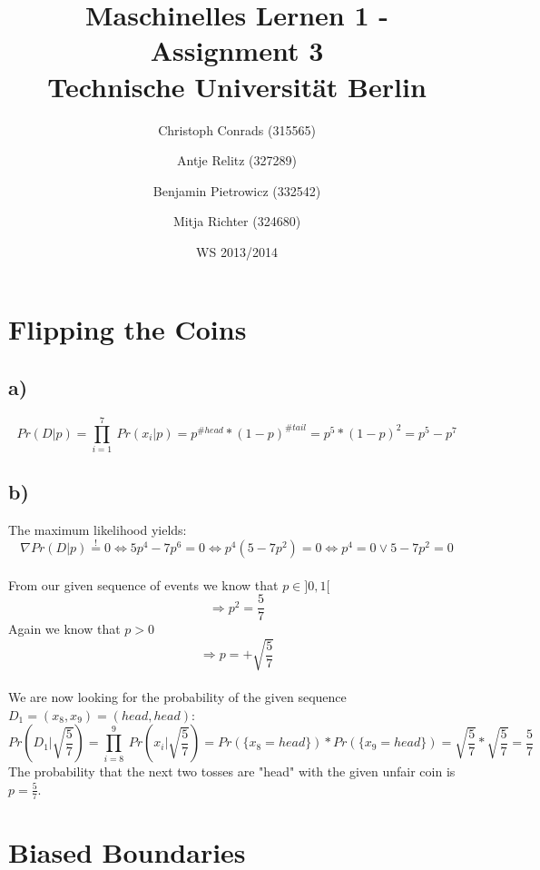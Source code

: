 \documentclass[paper=a4,fontsize=10pt,DIV11,BCOR10mm]{scrartcl}
\begin{document}
\title{Maschinelles Lernen 1 - Assignment 3\\
\small{Technische Universität Berlin}}


\author{\small{Christoph Conrads (315565)}\and \small{Antje Relitz (327289)}  \and \small{Benjamin Pietrowicz (332542)} \and \small{Mitja Richter (324680)} }

\date{WS 2013/2014}

\maketitle

\section{Flipping the Coins}

\subsection*{a)}

\[ Pr (D|p) = \prod_{i=1}^7\ Pr(x_i|p) = p^{\# head} * (1-p)^{\# tail} = p^5 * (1-p)^2 = p^5-p^7 \]



\subsection*{b)}
The maximum likelihood yields:
\[ \nabla Pr (D|p) \stackrel{!}{=} 0 \Leftrightarrow  5p^4 - 7p^6 = 0 \Leftrightarrow p^4(5-7p^2) = 0 \Leftrightarrow p^4 = 0 \lor 5-7p^2 = 0 \]\\
From our given sequence of events we know that $p\in ]0,1[$\\ 
\[\Rightarrow p^2 = \frac{5}{7}\]
Again we know that $p>0$
\[ \Rightarrow p = + \sqrt{\frac{5}{7}} \]
\\We are now looking for the probability of the given sequence $D_1 = (x_8,x_9) = (head,head)$:
\[Pr(D_1|\sqrt{\frac{5}{7}}) = \prod_{i=8}^9\ Pr(x_i|\sqrt{\frac{5}{7}}) =Pr(\{x_8=head\})*Pr(\{x_9 = head\}) = \sqrt{\frac{5}{7}} * \sqrt{\frac{5}{7}} = \frac{5}{7} \]
The probability that the next two tosses are "head" with the given unfair coin is
$ p = \frac{5}{7}$.

\section{Biased Boundaries}
\end{document}
